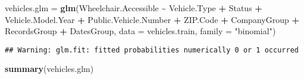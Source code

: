 \documentclass[
]{article}
\newenvironment{Shaded}{\begin{snugshade}}{\end{snugshade}}
\newcommand{\AttributeTok}[1]{\textcolor[rgb]{0.13,0.29,0.53}{#1}}
\newcommand{\FunctionTok}[1]{\textcolor[rgb]{0.13,0.29,0.53}{\textbf{#1}}}
\newcommand{\NormalTok}[1]{#1}
\newcommand{\OtherTok}[1]{\textcolor[rgb]{0.56,0.35,0.01}{#1}}
\newcommand{\SpecialCharTok}[1]{\textcolor[rgb]{0.81,0.36,0.00}{\textbf{#1}}}
\newcommand{\StringTok}[1]{\textcolor[rgb]{0.31,0.60,0.02}{#1}}
\begin{document}
\begin{Shaded}
\begin{Highlighting}[]
\NormalTok{vehicles.glm }\OtherTok{=} \FunctionTok{glm}\NormalTok{(Wheelchair.Accessible }\SpecialCharTok{\textasciitilde{}}\NormalTok{ Vehicle.Type }\SpecialCharTok{+}\NormalTok{ Status }\SpecialCharTok{+}\NormalTok{ Vehicle.Model.Year }
                   \SpecialCharTok{+}\NormalTok{ Public.Vehicle.Number }\SpecialCharTok{+}\NormalTok{ ZIP.Code }\SpecialCharTok{+}\NormalTok{ CompanyGroup}
                   \SpecialCharTok{+}\NormalTok{ RecordsGroup }\SpecialCharTok{+}\NormalTok{ DatesGroup, }\AttributeTok{data =}\NormalTok{ vehicles.train, }\AttributeTok{family =} \StringTok{"binomial"}\NormalTok{)}
\end{Highlighting}
\end{Shaded}

\begin{verbatim}
## Warning: glm.fit: fitted probabilities numerically 0 or 1 occurred
\end{verbatim}

\begin{Shaded}
\begin{Highlighting}[]
\FunctionTok{summary}\NormalTok{(vehicles.glm)}
\end{Highlighting}
\end{Shaded}
\end{document}
